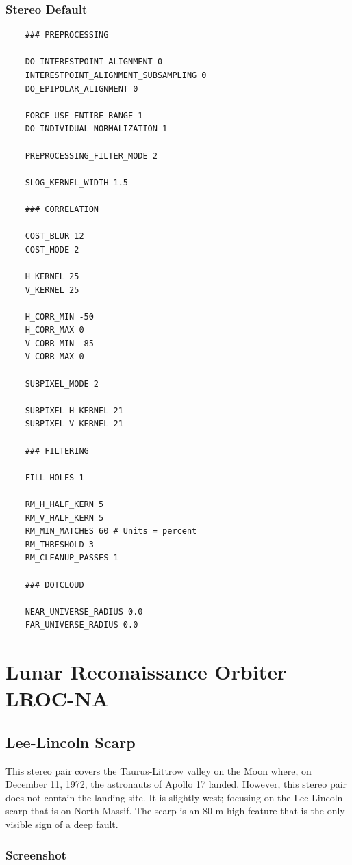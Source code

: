 \subsubsection*{Stereo Default}

\begin{verbatim}
    ### PREPROCESSING

    DO_INTERESTPOINT_ALIGNMENT 0
    INTERESTPOINT_ALIGNMENT_SUBSAMPLING 0
    DO_EPIPOLAR_ALIGNMENT 0

    FORCE_USE_ENTIRE_RANGE 1
    DO_INDIVIDUAL_NORMALIZATION 1

    PREPROCESSING_FILTER_MODE 2

    SLOG_KERNEL_WIDTH 1.5

    ### CORRELATION

    COST_BLUR 12
    COST_MODE 2

    H_KERNEL 25
    V_KERNEL 25

    H_CORR_MIN -50
    H_CORR_MAX 0
    V_CORR_MIN -85
    V_CORR_MAX 0

    SUBPIXEL_MODE 2

    SUBPIXEL_H_KERNEL 21
    SUBPIXEL_V_KERNEL 21

    ### FILTERING

    FILL_HOLES 1

    RM_H_HALF_KERN 5
    RM_V_HALF_KERN 5
    RM_MIN_MATCHES 60 # Units = percent
    RM_THRESHOLD 3
    RM_CLEANUP_PASSES 1

    ### DOTCLOUD

    NEAR_UNIVERSE_RADIUS 0.0
    FAR_UNIVERSE_RADIUS 0.0
\end{verbatim}


\section{Lunar Reconaissance Orbiter LROC-NA}

\subsection{Lee-Lincoln Scarp}

This stereo pair covers the Taurus-Littrow valley on the Moon where,
on December 11, 1972, the astronauts of Apollo 17 landed. However,
this stereo pair does not contain the landing site.  It is slightly
west; focusing on the Lee-Lincoln scarp that is on North Massif. The
scarp is an 80 m high feature that is the only visible sign of a deep
fault.

\subsubsection*{Screenshot}

